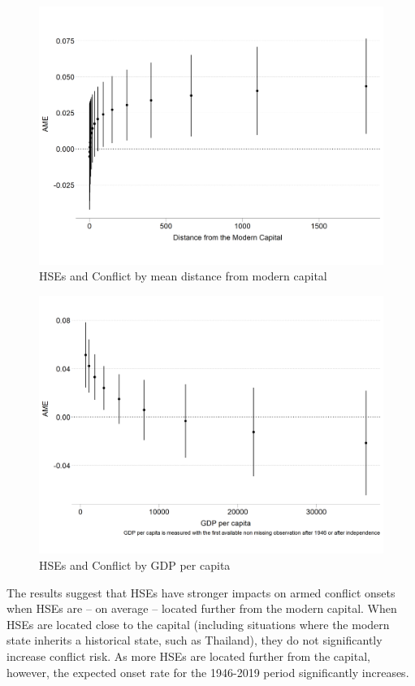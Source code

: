 \begin{figure}[!htb] 
	\includegraphics[width=\textwidth]{img/dist_interaction.png}
	\caption{HSEs and Conflict by mean distance from modern capital}
	\label{Fig: Int_Dist} 
\end{figure}

\begin{figure}[!htb] 
	\includegraphics[width=\textwidth]{img/gdp_interaction.png} 
	\caption{HSEs and Conflict by GDP per capita} 
	\label{Fig: Int_GDP} 
\end{figure}


The results suggest that HSEs have stronger impacts on armed conflict onsets
when HSEs are -- on average -- located further from the modern capital. When
HSEs are located close to the capital (including situations where the modern
state inherits a historical state, such as Thailand), they do not significantly
increase conflict risk. As more HSEs are located further from the capital,
however, the expected onset rate for the 1946-2019 period significantly
increases. 

